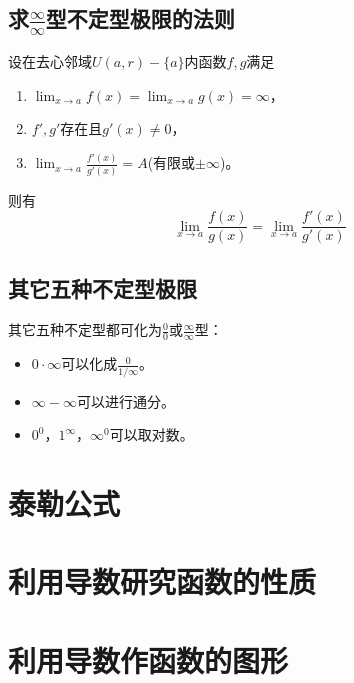 \subsection{求$\frac{\infty}{\infty}$型不定型极限的法则}
\begin{theorem}
  设在去心邻域$U(a,r)-\{a\}$内函数$f,g$满足
  \begin{enumerate}
    \item
    $\lim_{x\to a} f(x) = \lim_{x\to a}g(x) = \infty$，
    \item
    $f',g'$存在且$g'(x) \neq 0$，
    \item
    $\lim_{x\to a} \frac{f'(x)}{g'(x)}=A$(有限或$\pm\infty$)。
  \end{enumerate}
  则有
  \begin{displaymath}
    \lim_{x\to a}\frac{f(x)}{g(x)}=\lim_{x\to a} \frac{f'(x)}{g'(x)}
  \end{displaymath}
\end{theorem}

\subsection{其它五种不定型极限}
其它五种不定型都可化为$\frac{0}{0}$或$\frac{\infty}{\infty}$型：
\begin{itemize}
  \item
  $0\cdot\infty$可以化成$\frac{0}{1/\infty}$。
  \item
  $\infty - \infty$可以进行通分。
  \item
  $0^0$，$1^{\infty}$，$\infty^0$可以取对数。
\end{itemize}
\section{泰勒公式}

\section{利用导数研究函数的性质}

\section{利用导数作函数的图形}
